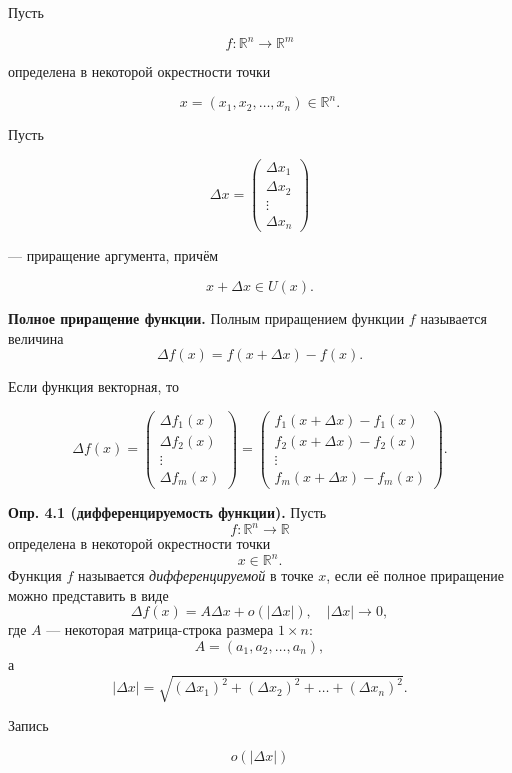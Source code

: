 \documentclass[a4paper,12pt]{article}
\begin{document}
Пусть

\[
f:\mathbb{R}^n\to\mathbb{R}^m
\]

определена в некоторой окрестности точки

\[
x=(x_1,x_2,\ldots,x_n)\in\mathbb{R}^n.
\]

Пусть

\[
\Delta x
=
\begin{pmatrix}
\Delta x_1\\
\Delta x_2\\
\vdots\\
\Delta x_n
\end{pmatrix}
\]

— приращение аргумента, причём

\[
x+\Delta x\in U(x).
\]

\begin{definitionbox}
\textbf{Полное приращение функции.}
Полным приращением функции $f$ называется величина
\[
\Delta f(x)
=
f(x+\Delta x)-f(x).
\]
\end{definitionbox}

Если функция векторная, то

\[
\Delta f(x)
=
\begin{pmatrix}
\Delta f_1(x)\\
\Delta f_2(x)\\
\vdots\\
\Delta f_m(x)
\end{pmatrix}
=
\begin{pmatrix}
f_1(x+\Delta x)-f_1(x)\\
f_2(x+\Delta x)-f_2(x)\\
\vdots\\
f_m(x+\Delta x)-f_m(x)
\end{pmatrix}.
\]

\begin{definitionbox}
\textbf{Опр. 4.1 (дифференцируемость функции).}
Пусть
\[
f:\mathbb{R}^n\to\mathbb{R}
\]
определена в некоторой окрестности точки
\[
x\in\mathbb{R}^n.
\]
Функция $f$ называется \textit{дифференцируемой} в точке $x$, если её полное приращение можно представить в виде
\[
\Delta f(x)
=
A\Delta x
+
o(|\Delta x|),
\quad
|\Delta x|\to 0,
\]
где $A$ — некоторая матрица-строка размера $1\times n$:
\[
A=(a_1,a_2,\ldots,a_n),
\]
а
\[
|\Delta x|
=
\sqrt{
(\Delta x_1)^2
+
(\Delta x_2)^2
+
\ldots
+
(\Delta x_n)^2
}.
\]
\end{definitionbox}

Запись

\[
o(|\Delta x|)
\]
\end{document}
